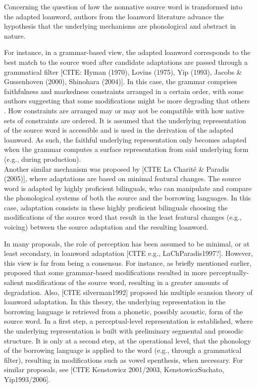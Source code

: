 Concerning the question of how the nonnative source word is transformed into the adapted loanword, authors from the loanword literature advance the hypothesis that the underlying mechanisms are phonological and abstract in nature.

For instance, in a grammar-based view, the adapted loanword corresponds to the best match to the source word after candidate adaptations are passed through a grammatical filter  [CITE: Hyman (1970), Lovins (1975), Yip (1993), Jacobs \& Gussenhoven (2000), Shinohara (2004)]. In this case, the grammar comprises faithfulness and markedness constraints arranged in a certain order, with some authors suggesting that some modifications might be more degrading that others \cite{steriade2001}. How constraints are arranged may or may not be compatible with how native sets of constraints are ordered. It is assumed that the underlying representation of the source word is accessible and is used in the derivation of the adapted loanword. As such, the faithful underlying representation only becomes adapted when the grammar computes a surface representation from said underlying form (e.g., during production).   \\

Another similar mechanism was proposed by [CITE La Charité \& Paradis (2005)], where adaptations are based on minimal featural changes. The source word is adapted by highly proficient bilinguals, who can manipulate and compare the phonological systems of both the source and the borrowing languages. In this case, adaptation consists in these highly proficient bilinguals choosing the modifications of the source word that result in the least featural changes (e.g., voicing) between the source adaptation and the resulting loanword.  

In many proposals, the role of perception has been assumed to be minimal, or at least secondary, in loanword adaptation [CITE e.g., LaChParadis1997?]. However, this view is far from being a consensus. For instance, as briefly mentioned earlier, \cite{steriade2001} proposed that some grammar-based modifications resulted in more perceptually-salient modifications of the source word, resulting in a greater amounts of degradation.
Also, [CITE silverman1992] proposed his multiple scansion theory of loanword adaptation. In this theory, the underlying representation in the borrowing language is retrieved from a phonetic, possibly acoustic, form of the source word. In a first step, a perceptual-level representation is established, where the underlying representation is built with preliminary segmental and prosodic structure. It is only at a second step, at the operational level, that the phonology of the borrowing language is applied to the word (e.g., through a grammatical filter), resulting in modifications such as vowel epenthesis, when necessary. For similar proposals, see [CITE Kenstowicz 2001/2003, KenstowiczSuchato, Yip1993/2006].  

